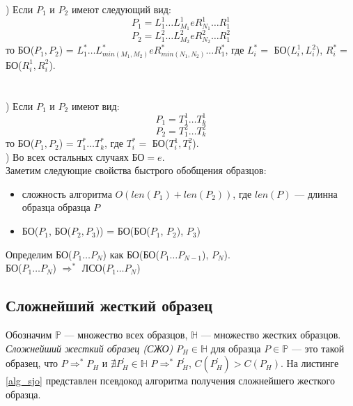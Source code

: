 \documentclass[12pt]{article}
\begin{document}
) Если $P_1$ и $P_2$ имеют следующий вид:
\begin{equation*}
P_1 = L_1^1 \ldots L_{M_1}^1 e R_{N_1}^1 \ldots R_1^1 
\end{equation*}
\begin{equation*}
P_2 = L_1^2 \ldots L_{M_2}^2 e R_{N_2}^2 \ldots R_1^2
\end{equation*}
\indent то БО($P_1, P_2$) = $L_1^* \ldots L_{min(M_1,M_2)}^* e R_{min(N_1,N_2)}^* \ldots R_1^*$, где $L_i^* = $ БО($L_i^1,L_i^2$), $R_i^* = $ БО($R_i^1,R_i^2$). \\
\\
\\
) Если $P_1$ и $P_2$ имеют вид:
\begin{equation*}
P_1 = T_1^1 \ldots T_k^1 
\end{equation*}
\begin{equation*}
P_2 = T_1^2 \ldots T_k^2
\end{equation*}
\indent то БО($P_1, P_2$) = $T_1^* \ldots T_k^*$, где $T_i^* = $ БО($T_i^1,T_i^2$).\\
) Во всех остальных случаях БО$ = e$.\\
\indent Заметим следующие свойства быстрого обобщения образцов:
\begin{itemize}
\item сложность алгоритма $O(len(P_1)+len(P_2))$, где $len(P)$ --- длинна образца образца $P$
\item БО($P_1$, БО($P_2, P_3$)) = БО(БО($P_1$, $P_2$), $P_3$)
\end{itemize}

\indent Определим БО($P_1 \ldots P_N$) как БО(БО($P_1 \ldots P_{N-1}$), $P_N$). \\
\indent БО($P_1 \ldots P_N$) $\Rightarrow^*$ ЛСО($P_1 \ldots P_N$)

\subsection[Сложнейший жесткий образец]{\large Сложнейший жесткий образец}
\hspace{\parindent} Обозначим $\mathbb{P}$ --- множество всех образцов, $\mathbb{H}$ --- множество жестких образцов. \textit{Сложнейший жесткий образец (СЖО)} $P_H \in \mathbb{H}$ для образца $P \in \mathbb{P}$ --- это такой образец, что $P \Rightarrow^* P_H$ и $\nexists P_H^{'} \in \mathbb{H}$ $ P \Rightarrow^* P_H^{'}$, $C(P_H^{'}) > C(P_H)$. На листинге \ref{alg_sjo} представлен псевдокод алгоритма получения сложнейшего жесткого образца.
\end{document}
